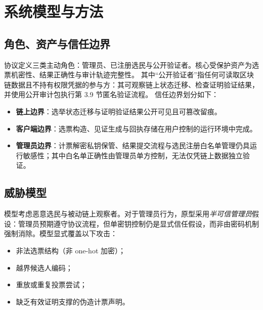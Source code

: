 ﻿\chapter{系统模型与方法}
\begingroup
\justifying
\setlength{\parindent}{0pt}
\setlength{\parskip}{0.5\baselineskip}
\titlespacing{\chapter}{0pt}{0pt}{0pt}
\titlespacing{\section}{0pt}{0pt}{0pt}

\section{角色、资产与信任边界}

协议定义三类主动角色：管理员、已注册选民与公开验证者。核心受保护资产为选票机密性、结果正确性与审计轨迹完整性。
其中“公开验证者”指任何可读取区块链数据且不持有权限凭据的参与方：其可观察链上状态迁移、检查证明验证结果，并使用公开审计包执行第 3.9 节匿名验证流程。
信任边界划分如下：
\begin{itemize}
    \item \textbf{链上边界}：选举状态迁移与证明验证结果公开可见且可篡改留痕。
    \item \textbf{客户端边界}：选票构造、见证生成与回执存储在用户控制的运行环境中完成。
    \item \textbf{管理员边界}：计票解密私钥保管、结果提交流程与选民注册白名单管理仍具运行敏感性；其中白名单正确性由管理员单方控制，无法仅凭链上数据独立验证。
\end{itemize}

\section{威胁模型}

模型考虑恶意选民与被动链上观察者。对于管理员行为，原型采用\emph{半可信管理员}假设：管理员预期遵守协议流程，但单密钥控制仍是显式信任假设，而非由密码机制强制消除。模型显式覆盖以下攻击：
\begin{itemize}
    \item 非法选票结构（非 one-hot 加密）；
    \item 越界候选人编码；
    \item 重放或重复投票尝试；
    \item 缺乏有效证明支撑的伪造计票声明。
\end{itemize}

